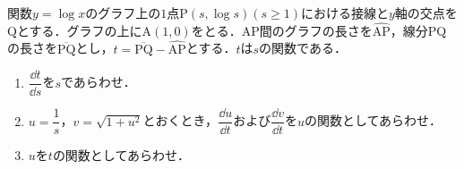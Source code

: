 関数$y=\log x$のグラフ上の$1$点$\mathrm{P}(s, \log s) (s\ge 1)$における接線と$y$軸の交点を$\mathrm{Q}$とする．グラフの上に$\mathrm{A}(1,0)$をとる．$\mathrm{AP}$間のグラフの長さを$\hat{\mathrm{AP}}$，線分$\mathrm{PQ}$の長さを$\overline{\mathrm{PQ}}$とし，$t=\overline{\mathrm{PQ}}-\hat{\mathrm{AP}}$とする．$t$は$s$の関数である．

\begin{enumerate}
  \item $\dfrac{\dd t}{\dd s}$を$s$であらわせ．
  \item $u=\dfrac{1}{s}$，$v=\sqrt{1+u^2}$とおくとき，$\dfrac{\dd u}{\dd t}$および$\dfrac{\dd v}{\dd t}$を$u$の関数としてあらわせ．
  \item $u$を$t$の関数としてあらわせ．
\end{enumerate}
